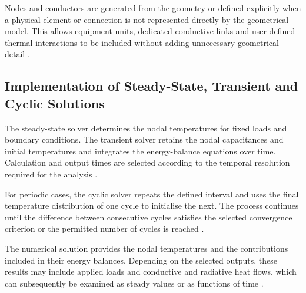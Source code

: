 Nodes and conductors are generated from the geometry or defined explicitly when a 
physical element or connection is not represented directly by the geometrical model. 
This allows equipment units, dedicated conductive links and user-defined thermal 
interactions to be included without adding unnecessary geometrical detail 
\cite{thermal_eng_man,esatan_user_man}.

\subsection{Implementation of Steady-State, Transient and Cyclic Solutions}

The steady-state solver determines the nodal temperatures for fixed loads 
and boundary conditions. The transient solver retains the nodal capacitances and initial 
temperatures and integrates the energy-balance equations over time. Calculation and 
output times are selected according to the temporal resolution required for the analysis 
\cite{thermal_eng_man,esatan_training_man}.

For periodic cases, the cyclic solver repeats the defined interval and uses the final 
temperature distribution of one cycle to initialise the next. The process continues 
until the difference between consecutive cycles satisfies the selected convergence 
criterion or the permitted number of cycles is reached 
\cite{thermal_eng_man,esatan_training_man,esatan_gsg}.

The numerical solution provides the nodal temperatures and the contributions included 
in their energy balances. Depending on the selected outputs, these results may include 
applied loads and conductive and radiative heat flows, which can subsequently be examined 
as steady values or as functions of time 
\cite{esatan_user_man,esatan_training_man}.